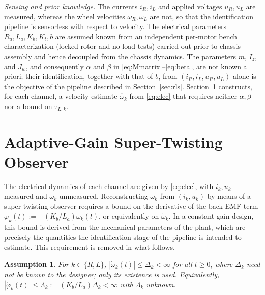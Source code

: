 \documentclass[letterpaper, 10 pt, conference]{ieeeconf}
\newtheorem{assumption}[theorem]{Assumption}
\begin{document}
\emph{Sensing and prior knowledge.} The currents $i_R,i_L$ and applied voltages $u_R,u_L$ are measured, whereas the wheel velocities $\omega_R,\omega_L$ are not, so that the identification pipeline is sensorless with respect to velocity. The electrical parameters $R_a,L_a,K_b,K_t,b$ are assumed known from an independent per-motor bench characterization (locked-rotor and no-load tests) carried out prior to chassis assembly and hence decoupled from the chassis dynamics. The parameters $m$, $I_z$, and $J_w$, and consequently $\alpha$ and $\beta$ in \eqref{eq:Mmatrix}--\eqref{eq:beta}, are not known a priori; their identification, together with that of $b$, from $(i_R,i_L,u_R,u_L)$ alone is the objective of the pipeline described in Section~\ref{sec:rls}. Section~\ref{sec:observer} constructs, for each channel, a velocity estimate $\hat\omega_k$ from \eqref{eq:elec} that requires neither $\alpha,\beta$ nor a bound on $\tau_{L,k}$.

\section{Adaptive-Gain Super-Twisting Observer}
\label{sec:observer}

The electrical dynamics of each channel are given by \eqref{eq:elec}, with $i_k,u_k$ measured and $\omega_k$ unmeasured. Reconstructing $\omega_k$ from $(i_k,u_k)$ by means of a super-twisting observer requires a bound on the derivative of the back-EMF term $\varphi_k(t):=-(K_b/L_a)\omega_k(t)$, or equivalently on $\dot\omega_k$. In a constant-gain design, this bound is derived from the mechanical parameters of the plant, which are precisely the quantities the identification stage of the pipeline is intended to estimate. This requirement is removed in what follows.

\begin{assumption}
\label{as:bounded}
For $k\in\{R,L\}$, $|\dot\omega_k(t)|\le\Delta_k<\infty$ for all $t\ge0$, where $\Delta_k$ need not be known to the designer; only its existence is used. Equivalently, $|\dot\varphi_k(t)|\le\Lambda_k:=(K_b/L_a)\Delta_k<\infty$ with $\Lambda_k$ unknown.
\end{assumption}
\end{document}
